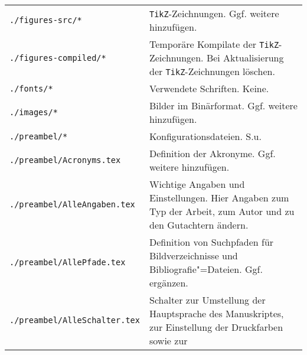 \begin{longtable}{l@{\extracolsep{8pt}}X}
\texttt{./figures-src/*}                  & \texttt{TikZ}-Zeichnungen. %
                                          Ggf. weitere hinzufügen.\\
\texttt{./figures-compiled/*}             & Temporäre Kompilate der \texttt{TikZ}-Zeichnungen.
                                          Bei Aktualisierung der \texttt{TikZ}-Zeichnungen löschen.\\
\texttt{./fonts/*}                        & Verwendete Schriften. Keine.\\
\texttt{./images/*}                       & Bilder im Binärformat. %
                                          Ggf. weitere hinzufügen. \\
\texttt{./preambel/*}                     & Konfigurationsdateien. S.u.\\
\texttt{./preambel/Acronyms.tex}          & Definition der Akronyme.
                                          Ggf. weitere hinzufügen.\\
\texttt{./preambel/AlleAngaben.tex}       & Wichtige Angaben und Einstellungen.
                                          Hier Angaben zum Typ der Arbeit, zum Autor und zu den Gutachtern ändern.\\
\texttt{./preambel/AllePfade.tex}         & Definition von Suchpfaden für Bildverzeichnisse und Bibliografie"=Dateien.
                                          Ggf. ergänzen.\\
\texttt{./preambel/AlleSchalter.tex}      & Schalter zur Umstellung der Hauptsprache des Manuskriptes,
                                          zur Einstellung der Druckfarben sowie zur

\end{longtable}
